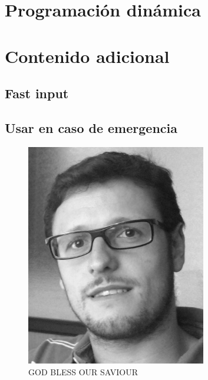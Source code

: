 \documentclass[oneside]{book}
\begin{document}
	\chapter{Programaci\'on din\'amica}
	\chapter{Contenido adicional}
	\section{Fast input}
	
	\section{Usar en caso de emergencia}
	\begin{figure}[h]
		\centering
		\includegraphics[width=0.7\textwidth]{foto}
		\caption*{GOD BLESS OUR SAVIOUR}
	\end{figure}
	\backmatter
	\printindex
\end{document}

